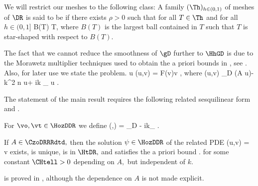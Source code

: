 We will restrict our meshes to the following class:
A family $(\Th)_{h \in (0,1)}$ of meshes of $\DR$ is said to be  if there exists $\rho > 0$ such that for all $T \in \Th$ and for all $h \in (0,1]$
  \beqs
\diam B(T) \geq \rho \diam T,
\eeqs
where $B(T)$ is the largest ball contained in $T$ such that $T$ is star-shaped with respect to $B(T)$.
\ede

The fact that we cannot reduce the smoothness of $\gD$ further to $\HhGD$ is due to the Morawetz multiplier techniques used to obtain the a priori bounds in \cite{GrPeSp:19}, see \cite[(iii), p. 2874]{GrPeSp:19}.
Also, for later use we state the  problem.
\beq\label{eq:tedpadj}
 u \in \HozDDR\quad \tst\quad \aadj(u,v) = F(v)\quad \tfa v \in \HozDDR,
\eeq
where
\beqs
\aadj(u,v) \de \int_D \mleft(A \grad u\mright)\cdot \grad \vb - k^2 n u\vb + ik \int_{\GI} \trGI u \trGI \vb.
\eeqs

The statement of the main result requires the following related sesquilinear form and .

For $\vo, \vt \in \HozDDR$ we define
\beqs
\api(\vo,\vt) = \int_D  - ik\int_{\GI} \vo\vtbar.
\eeqs
\ede

\label{lem:relatedwp}
If $A \in \CzoDRRRdtd,$ then the solution $\psi \in \HozDDR$ of the related PDE
\beq\label{eq:relpde}
\api(u,v) = \quad \tfa\quad v \in \HozDDR
\eeq
exists, is unique, is in $\HtDR,$ and satisfies the a priori bound
\beqs
\NHtDR{\psi} \lesssim \CHtell {}.
\eeqs
for some constant $\CHtell > 0$ depending on $A,$ but independent of $k.$
\ele

 is proved in \cite{ChNiTo:18}, although the dependence on $A$ is not made explicit.
\ere


